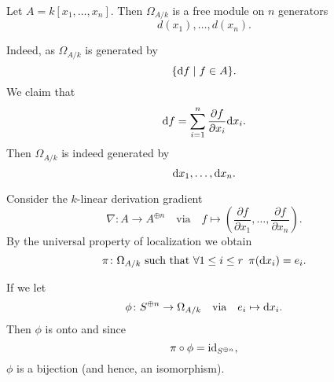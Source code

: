 \begin{example}
  Let $A = k[x_1, \dotsc, x_n]$. Then
  $\Omega_{A/{k}}$ is a free module on $n$ generators
  \[d(x_1), \dotsc, d(x_n).\]

  Indeed, as $\Omega_{A/{k}}$ is generated by
  \[ \{ \text{d} f \mathrel{|} f \in A\}.\]
  We claim that
  \[ \text{d} f = \sum_{i=1}^n \frac{\partial f}{\partial x_i} \text{d} x_i.\]
  Then $\Omega_{A /{k}}$ is indeed generated by
  \[ \text{d} x_1, \dotsc, \text{d} x_n.\]

  Consider the $k$-linear derivation gradient
  \[ \nabla \colon A \to A^{\oplus n} \quad \text{via} \quad f \mapsto ( \frac{\partial f}{\partial x_1}, \dotsc, \frac{\partial f}{\partial x_n}).\]
  By the universal property of localization we obtain
  \[ \pi \colon \Omega_{A /{k}} \text{ such that } \forall 1 \leq i \leq r \enspace \pi(\text{d} x_i) = e_i.\]

  If we let
  \[ \phi \colon S^{\oplus n} \to \Omega_{A /{k}} \quad \text{via} \quad e_i \mapsto \text{d} x_i.\]
  Then $\phi$ is onto and since
  \[ \pi \circ \phi = \text{id}_{S^{\oplus n}},\]
  $\phi$ is a bijection (and hence, an isomorphism).
\end{example}



